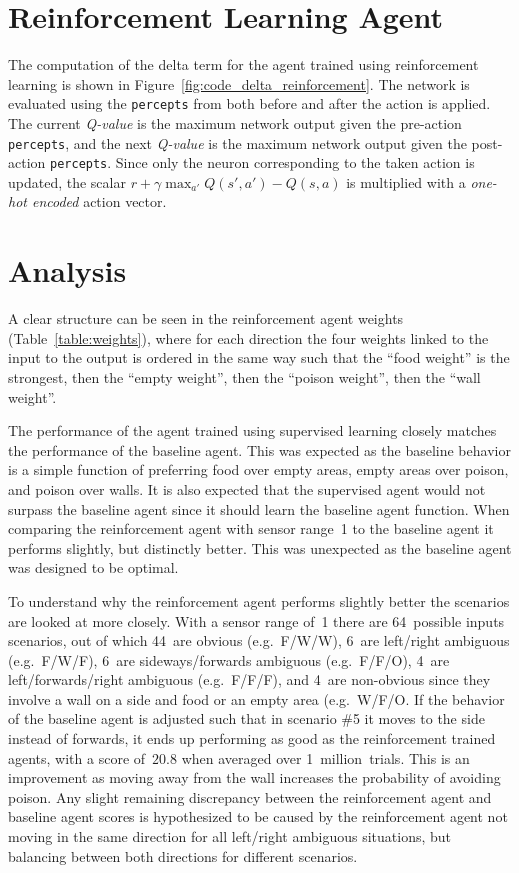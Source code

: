 \documentclass[paper=a4, fontsize=10pt]{scrartcl}
\begin{document}
\begin{multicols}{2}
\section*{Reinforcement Learning Agent}

The computation of the delta term for the agent trained using reinforcement learning is shown in Figure~\ref{fig:code_delta_reinforcement}. The network is evaluated using the \texttt{percepts} from both before and after the action is applied. The current \textit{Q-value} is the maximum network output given the pre-action \texttt{percepts}, and the next \textit{Q-value} is the maximum network output given the post-action \texttt{percepts}. Since only the neuron corresponding to the taken action is updated, the scalar ${r + \gamma \max_{a'} Q(s', a') - Q(s, a)}$ is multiplied with a \textit{one-hot encoded} action vector.

\vspace{-0.3cm}
\section*{Analysis}

A clear structure can be seen in the reinforcement agent weights (Table~\ref{table:weights}), where for each direction the four weights linked to the input to the output is ordered in the same way such that the ``food weight'' is the strongest, then the ``empty weight'', then the ``poison weight'', then the ``wall weight''.

The performance of the agent trained using supervised learning closely matches the performance of the baseline agent. This was expected as the baseline behavior is a simple function of preferring food over empty areas, empty areas over poison, and poison over walls. It is also expected that the supervised agent would not surpass the baseline agent since it should learn the baseline agent function. When comparing the reinforcement agent with sensor range~1 to the baseline agent it performs slightly, but distinctly better. This was unexpected as the baseline agent was designed to be optimal.

To understand why the reinforcement agent performs slightly better the scenarios are looked at more closely. With a sensor range of~1 there are 64~possible inputs scenarios, out of which 44~are obvious (e.g.~\textsc{F/W/W}), 6~are left/right ambiguous (e.g.~\textsc{F/W/F}), 6~are sideways/forwards ambiguous (e.g.~\textsc{F/F/O}), 4~are left/forwards/right ambiguous (e.g.~\textsc{F/F/F}), and 4~are non-obvious since they involve a wall on a side and food or an empty area (e.g.~\textsc{W/F/O}. If the behavior of the baseline agent is adjusted such that in scenario \#5 it moves to the side instead of forwards, it ends up performing as good as the reinforcement trained agents, with a score of~$20.8$ when averaged over 1~million~trials. This is an improvement as moving away from the wall increases the probability of avoiding poison. Any slight remaining discrepancy between the reinforcement agent and baseline agent scores is hypothesized to be caused by the reinforcement agent not moving in the same direction for all left/right ambiguous situations, but balancing between both directions for different scenarios.


\end{multicols}
\end{document}
